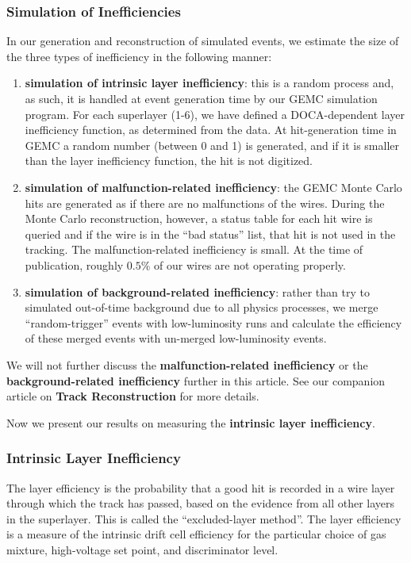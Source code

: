 \subsubsection{Simulation of Inefficiencies}
In our generation and reconstruction of simulated events, we estimate the size of
the three types of inefficiency in the following manner:

\begin{enumerate}
\item {\bf simulation of intrinsic layer inefficiency}: this is a random process
and, as such, it is handled at event generation time by our GEMC simulation
program.  For each superlayer (1-6), we have defined a DOCA-dependent
layer inefficiency function, as determined from the data.  At hit-generation
time in GEMC a random number (between 0 and 1) is generated, and if it is
smaller than the layer inefficiency function, the hit is not digitized.
\item {\bf simulation of malfunction-related inefficiency}: the GEMC Monte
Carlo hits are generated as if there are no malfunctions of the wires.
During the Monte Carlo reconstruction, however, a status table for each
hit wire is queried and if the wire is in the ``bad status'' list, that
hit is not used in the tracking.  The malfunction-related inefficiency  is small.  
At the time of publication,
roughly $0.5\%$ of our wires are not operating properly.  
\item {\bf simulation of background-related inefficiency}: rather than try
to simulated out-of-time background due to all physics processes, we merge
``random-trigger'' events with low-luminosity runs and calculate the
efficiency of these merged events with un-merged low-luminosity events.
\end{enumerate}

We will not further discuss the {\bf malfunction-related inefficiency} or
the {\bf background-related inefficiency} further in this article.  See
our companion article on {\bf Track Reconstruction} for more details.

Now we present our results on measuring the {\bf intrinsic layer  inefficiency}.

\subsubsection{Intrinsic Layer Inefficiency}
The layer efficiency is the probability that a
good hit is recorded in a wire layer through which the track has passed, based on 
the evidence from all other layers in the superlayer.  This is called the 
``excluded-layer method''.  The layer efficiency is a measure of the intrinsic drift 
cell efficiency for the particular choice of gas mixture, high-voltage set point, and 
discriminator level.  

